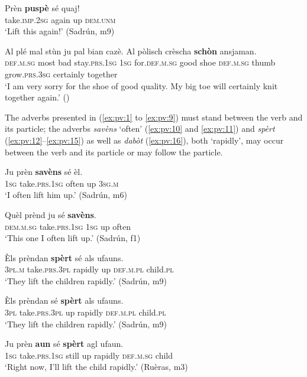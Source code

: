 \ea
\label{ex:pv:8}
\gll  Prèn \textbf{puspè} sé quaj! \\
take.\textsc{imp.2sg} again up \textsc{dem.unm}  \\
\glt `Lift this again!' (Sadrún, m9)
\z

\ea
\label{ex:pv:9}
\gll  Al plé mal stùn ju pal bian cazè. Al pòlisch crèscha \textbf{schòn} ansjaman.\\
     \textsc{def.m.sg}  most bad stay.\textsc{prs.1sg}  \textsc{1sg} for.\textsc{def.m.sg} good shoe \textsc{def.m.sg} thumb grow.\textsc{prs.3sg}  certainly together\\
\glt `I am very sorry for the shoe of good quality. My big toe will certainly knit together again.' (\citealt[51]{Berther1998})
\z

The adverbs presented in (\ref{ex:pv:1} to \ref{ex:pv:9}) must stand between the verb and its particle;  the adverbs \textit{savèns} `often' (\ref{ex:pv:10} and \ref{ex:pv:11}) and \textit{spèrt}  (\ref{ex:pv:12}--\ref{ex:pv:15}) as well as \textit{dabòt} (\ref{ex:pv:16}), both `rapidly', may occur between the verb and its particle or may follow the particle.

\ea
\label{ex:pv:10}
\gll    Ju prèn \textbf{savèns} sé èl.\\
     \textsc{1sg} take.\textsc{prs.1sg} often up \textsc{3sg.m}\\
\glt `I often lift him up.' (Sadrún, m6)
\z

\ea
\label{ex:pv:11}
\gll    Quèl prènd ju sé \textbf{savèns}.\\
     \textsc{dem.m.sg} take.\textsc{prs.1sg} \textsc{1sg} up often\\
\glt `This one I often lift up.' (Sadrún, f1)
\z

\ea
\label{ex:pv:12}
\gll Èls prèndan \textbf{spèrt} sé als ufauns.   \\
\textsc{3pl.m} take.\textsc{prs.3pl} rapidly up \textsc{def.m.pl} child.\textsc{pl}  \\
\glt `They lift the children rapidly.' (Sadrún, m9)
\z

\ea
\label{ex:pv:13}
\gll Èls prèndan sé \textbf{spèrt} als ufauns.   \\
   \textsc{3pl} take.\textsc{prs.3pl} up rapidly \textsc{def.m.pl} child.\textsc{pl}  \\
\glt `They lift the children rapidly.' (Sadrún, m9)
\z

\ea
\label{ex:pv:14}
\gll Ju prèn \textbf{aun} sé \textbf{spèrt} agl ufaun.    \\
    \textsc{1sg} take.\textsc{prs.1sg} still up rapidly \textsc{def.m.sg} child \\
\glt `Right now, I’ll lift the child rapidly.' (Ruèras, m3)
\z

